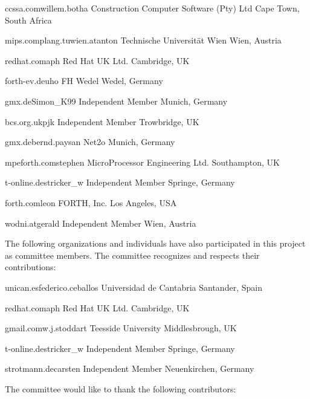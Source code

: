 	{ccssa.com}{willem.botha}
	{Construction Computer Software (Pty) Ltd}
	{Cape Town, South Africa}

	{mips.complang.tuwien.at}{anton}
	{Technische Universit\"at Wien}
	{Wien, Austria}

	{redhat.com}{aph}
	{Red Hat UK Ltd.}
	{Cambridge, UK}

	{forth-ev.de}{uho}
	{FH Wedel}
	{Wedel, Germany}

	{gmx.de}{Simon\_K99}
	{Independent Member}
	{Munich, Germany}

	{bcs.org.uk}{pjk}
	{Independent Member}
	{Trowbridge, UK}

	{gmx.de}{bernd.paysan}
	{Net2o}
	{Munich, Germany}

	{mpeforth.com}{stephen}
	{MicroProcessor Engineering Ltd.}
	{Southampton, UK}

	{t-online.de}{stricker\_w}
	{Independent Member}
	{Springe, Germany}

	{forth.com}{leon}
	{FORTH, Inc.}
	{Los Angeles, USA}

	{wodni.at}{gerald}
	{Independent Member}
	{Wien, Austria}

The following organizations and individuals have also participated in
this project as committee members. The committee recognizes and
respects their contributions:

	{unican.es}{federico.ceballos}
	{Universidad de Cantabria}
	{Santander, Spain}

	{redhat.com}{aph}
	{Red Hat UK Ltd.}
	{Cambridge, UK}

	{gmail.com}{w.j.stoddart}
	{Teesside University}
	{Middlesbrough, UK}

	{t-online.de}{stricker\_w}
	{Independent Member}
	{Springe, Germany}

	{strotmann.de}{carsten}
	{Independent Member}
	{Neuenkirchen, Germany}

The committee would like to thank the following contributors:

